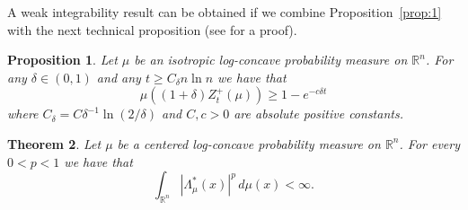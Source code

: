 \documentclass[11pt,leqno]{article}
\newtheorem{theorem}{Theorem}[section]
\newtheorem{proposition}[theorem]{Proposition}
\theoremstyle{definition}
\theoremstyle{remark}
\numberwithin{equation}{section}
\newcommand{\gr}{\geqslant}
\newcommand{\1}{\textbf{1}}
\begin{document}
A weak integrability result can be obtained if we combine Proposition~\ref{prop:1} with the next technical proposition (see \cite[Proposition~5.6]{BGP-depth} for a proof).

\begin{proposition}\label{prop:3-weak}Let $\mu $ be an isotropic log-concave probability measure on ${\mathbb R}^n$. For any $\delta\in (0,1)$
and any $t\gr C_{\delta }n\ln n$ we have that $$\mu ((1+\delta )Z_t^+(\mu ))\gr 1-e^{-c\delta t}$$
where $C_{\delta }=C\delta^{-1}\ln\left(2/\delta\right)$ and $C,c>0$ are absolute positive constants.
\end{proposition}


\begin{theorem}\label{th:moments-weak}Let $\mu$ be a centered log-concave probability measure on ${\mathbb R}^n$.
For every $0<p<1$ we have that
$$\int_{{\mathbb R}^n}|\Lambda_{\mu}^{\ast }(x)|^p\,d\mu(x)<\infty .$$
\end{theorem}
\end{document}

